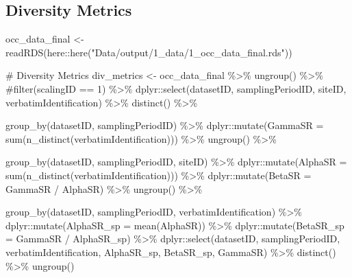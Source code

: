 \documentclass[
  letterpaper,
  DIV=11,
  numbers=noendperiod]{scrreprt}
\newenvironment{Shaded}{\begin{snugshade}}{\end{snugshade}}
\newcommand{\AttributeTok}[1]{\textcolor[rgb]{0.40,0.45,0.13}{#1}}
\newcommand{\CommentTok}[1]{\textcolor[rgb]{0.37,0.37,0.37}{#1}}
\newcommand{\FunctionTok}[1]{\textcolor[rgb]{0.28,0.35,0.67}{#1}}
\newcommand{\NormalTok}[1]{\textcolor[rgb]{0.00,0.23,0.31}{#1}}
\newcommand{\OtherTok}[1]{\textcolor[rgb]{0.00,0.23,0.31}{#1}}
\newcommand{\SpecialCharTok}[1]{\textcolor[rgb]{0.37,0.37,0.37}{#1}}
\newcommand{\StringTok}[1]{\textcolor[rgb]{0.13,0.47,0.30}{#1}}
\begin{document}
\hypertarget{diversity-metrics}{%
\subsection{Diversity Metrics}\label{diversity-metrics}}

\begin{Shaded}
\begin{Highlighting}[]
\NormalTok{occ\_data\_final }\OtherTok{\textless{}{-}} \FunctionTok{readRDS}\NormalTok{(here}\SpecialCharTok{::}\FunctionTok{here}\NormalTok{(}\StringTok{"Data/output/1\_data/1\_occ\_data\_final.rds"}\NormalTok{))}

\CommentTok{\# Diversity Metrics}
\NormalTok{div\_metrics }\OtherTok{\textless{}{-}}\NormalTok{ occ\_data\_final }\SpecialCharTok{\%\textgreater{}\%}
  \FunctionTok{ungroup}\NormalTok{() }\SpecialCharTok{\%\textgreater{}\%}
  \CommentTok{\#filter(scalingID == 1) \%\textgreater{}\%}
\NormalTok{  dplyr}\SpecialCharTok{::}\FunctionTok{select}\NormalTok{(datasetID, samplingPeriodID, siteID, verbatimIdentification) }\SpecialCharTok{\%\textgreater{}\%}
  \FunctionTok{distinct}\NormalTok{() }\SpecialCharTok{\%\textgreater{}\%}

  \FunctionTok{group\_by}\NormalTok{(datasetID, samplingPeriodID) }\SpecialCharTok{\%\textgreater{}\%}
\NormalTok{  dplyr}\SpecialCharTok{::}\FunctionTok{mutate}\NormalTok{(}\AttributeTok{GammaSR =} \FunctionTok{sum}\NormalTok{(}\FunctionTok{n\_distinct}\NormalTok{(verbatimIdentification))) }\SpecialCharTok{\%\textgreater{}\%}
  \FunctionTok{ungroup}\NormalTok{() }\SpecialCharTok{\%\textgreater{}\%}

  \FunctionTok{group\_by}\NormalTok{(datasetID, samplingPeriodID, siteID) }\SpecialCharTok{\%\textgreater{}\%}
\NormalTok{  dplyr}\SpecialCharTok{::}\FunctionTok{mutate}\NormalTok{(}\AttributeTok{AlphaSR =} \FunctionTok{sum}\NormalTok{(}\FunctionTok{n\_distinct}\NormalTok{(verbatimIdentification))) }\SpecialCharTok{\%\textgreater{}\%}
\NormalTok{  dplyr}\SpecialCharTok{::}\FunctionTok{mutate}\NormalTok{(}\AttributeTok{BetaSR =}\NormalTok{ GammaSR }\SpecialCharTok{/}\NormalTok{ AlphaSR) }\SpecialCharTok{\%\textgreater{}\%}
  \FunctionTok{ungroup}\NormalTok{() }\SpecialCharTok{\%\textgreater{}\%}

  \FunctionTok{group\_by}\NormalTok{(datasetID, samplingPeriodID, verbatimIdentification) }\SpecialCharTok{\%\textgreater{}\%}
\NormalTok{  dplyr}\SpecialCharTok{::}\FunctionTok{mutate}\NormalTok{(}\AttributeTok{AlphaSR\_sp =} \FunctionTok{mean}\NormalTok{(AlphaSR)) }\SpecialCharTok{\%\textgreater{}\%}
\NormalTok{  dplyr}\SpecialCharTok{::}\FunctionTok{mutate}\NormalTok{(}\AttributeTok{BetaSR\_sp =}\NormalTok{ GammaSR }\SpecialCharTok{/}\NormalTok{ AlphaSR\_sp) }\SpecialCharTok{\%\textgreater{}\%}
\NormalTok{  dplyr}\SpecialCharTok{::}\FunctionTok{select}\NormalTok{(datasetID, samplingPeriodID, verbatimIdentification, AlphaSR\_sp, BetaSR\_sp, GammaSR) }\SpecialCharTok{\%\textgreater{}\%}
  \FunctionTok{distinct}\NormalTok{() }\SpecialCharTok{\%\textgreater{}\%}
  \FunctionTok{ungroup}\NormalTok{()}


\end{Highlighting}
\end{Shaded}
\end{document}
